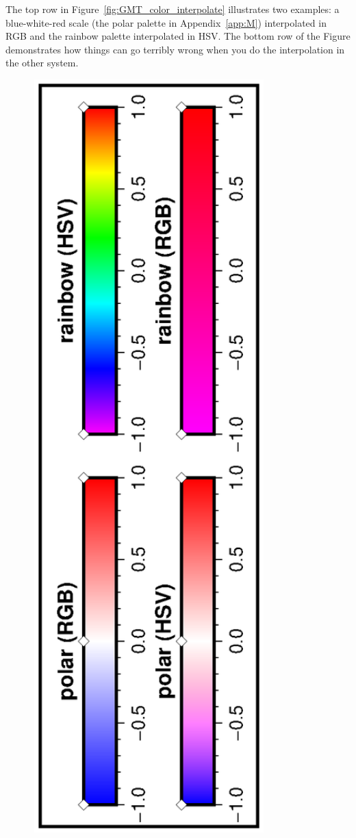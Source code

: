 The top row in Figure~\ref{fig:GMT_color_interpolate} illustrates two examples: a blue-white-red scale (the \textsf{polar} palette in Appendix~\ref{app:M}) interpolated in RGB and the \textsf{rainbow} palette interpolated in HSV. The bottom row of the Figure demonstrates how things can go terribly wrong when you do the interpolation in the other system.

\begin{figure}[h]
   \centering
   \includegraphics[width=0.80\textwidth]{scripts/GMT_color_interpolate}%

\end{figure}
